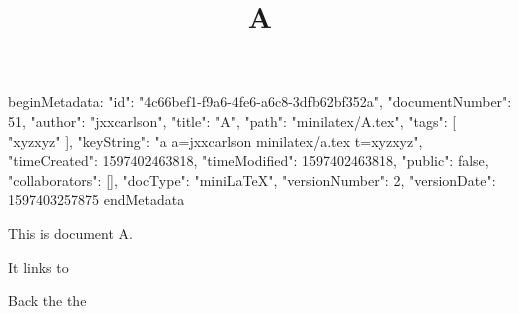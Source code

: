 beginMetadata:
{
    "id": "4c66bef1-f9a6-4fe6-a6c8-3dfb62bf352a",
    "documentNumber": 51,
    "author": "jxxcarlson",
    "title": "A",
    "path": "minilatex/A.tex",
    "tags": [
        "xyzxyz"
    ],
    "keyString": "a a=jxxcarlson minilatex/a.tex t=xyzxyz",
    "timeCreated": 1597402463818,
    "timeModified": 1597402463818,
    "public": false,
    "collaborators": [],
    "docType": "miniLaTeX",
    "versionNumber": 2,
    "versionDate": 1597403257875
}
endMetadata
\title{A}

\maketitle

This is document A.

It links to 

Back the the 
